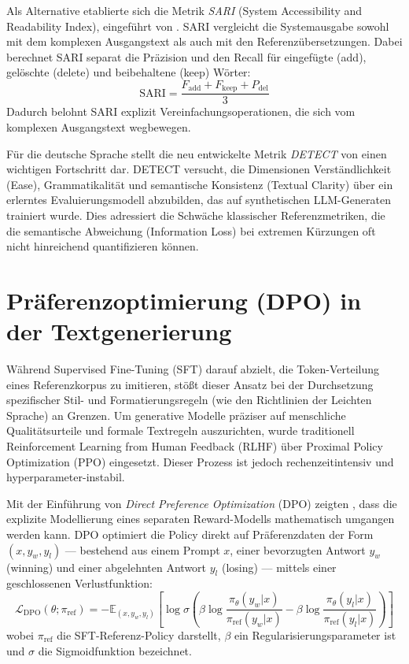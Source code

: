 Als Alternative etablierte sich die Metrik \textit{SARI} (System Accessibility and Readability Index), eingeführt von \citet{xu2016optimizing}. SARI vergleicht die Systemausgabe sowohl mit dem komplexen Ausgangstext als auch mit den Referenzübersetzungen. Dabei berechnet SARI separat die Präzision und den Recall für eingefügte (add), gelöschte (delete) und beibehaltene (keep) Wörter:
\begin{equation}
    \text{SARI} = \frac{F_{\text{add}} + F_{\text{keep}} + P_{\text{del}}}{3}
\end{equation}
Dadurch belohnt SARI explizit Vereinfachungsoperationen, die sich vom komplexen Ausgangstext wegbewegen.

Für die deutsche Sprache stellt die neu entwickelte Metrik \textit{DETECT} von \citet{stodden2026detect} einen wichtigen Fortschritt dar. DETECT versucht, die Dimensionen Verständlichkeit (Ease), Grammatikalität und semantische Konsistenz (Textual Clarity) über ein erlerntes Evaluierungsmodell abzubilden, das auf synthetischen LLM-Generaten trainiert wurde. Dies adressiert die Schwäche klassischer Referenzmetriken, die die semantische Abweichung (Information Loss) bei extremen Kürzungen oft nicht hinreichend quantifizieren können.

\section{Präferenzoptimierung (DPO) in der Textgenerierung}
\label{sec:dpo_textgenerierung}

Während Supervised Fine-Tuning (SFT) darauf abzielt, die Token-Verteilung eines Referenzkorpus zu imitieren, stößt dieser Ansatz bei der Durchsetzung spezifischer Stil- und Formatierungsregeln (wie den Richtlinien der Leichten Sprache) an Grenzen. Um generative Modelle präziser auf menschliche Qualitätsurteile und formale Textregeln auszurichten, wurde traditionell Reinforcement Learning from Human Feedback (RLHF) über Proximal Policy Optimization (PPO) eingesetzt. Dieser Prozess ist jedoch rechenzeitintensiv und hyperparameter-instabil.

Mit der Einführung von \textit{Direct Preference Optimization} (DPO) zeigten \citet{rafailov2023direct}, dass die explizite Modellierung eines separaten Reward-Modells mathematisch umgangen werden kann. DPO optimiert die Policy direkt auf Präferenzdaten der Form $(x, y_w, y_l)$ — bestehend aus einem Prompt $x$, einer bevorzugten Antwort $y_w$ (winning) und einer abgelehnten Antwort $y_l$ (losing) — mittels einer geschlossenen Verlustfunktion:
\begin{equation}
    \mathcal{L}_{\text{DPO}}(\theta; \pi_{\text{ref}}) = - \mathbb{E}_{(x, y_w, y_l)} \left[ \log \sigma \left( \beta \log \frac{\pi_\theta(y_w | x)}{\pi_{\text{ref}}(y_w | x)} - \beta \log \frac{\pi_\theta(y_l | x)}{\pi_{\text{ref}}(y_l | x)} \right) \right]
\end{equation}
wobei $\pi_{\text{ref}}$ die SFT-Referenz-Policy darstellt, $\beta$ ein Regularisierungsparameter ist und $\sigma$ die Sigmoidfunktion bezeichnet.

